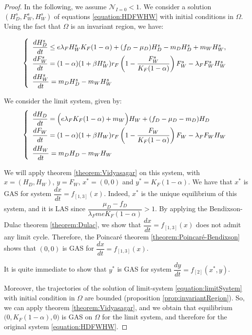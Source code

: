 \documentclass{article}
\newcommand{\lfw}{\lambda_{F}}
\newcommand{\lfw}{\lambda_{F}}
\begin{document}
\begin{proof}
In the following, we assume $ \mathcal{N}_{I =0} < 1$. We consider a solution $(H_D^s, F_W^s, H_W^s)$ of equations \eqref{equation:HDFWHW} with initial conditions in $\Omega$. Using the fact that $\Omega$ is an invariant region, we have:

\begin{equation}
\def\arraystretch{2}
\left\{ \begin{array}{l}
\dfrac{dH^s_D}{dt} \leq e\lfw H^s_W K_F(1-\alpha) + (f_D - \mu_D) H^s_D - m_D H^s_D + m_W H^s_W , \\
\dfrac{dF^s_W}{dt} = (1-\alpha)(1 + \beta H_W^s) r_F \left(1 - \dfrac{F^s_W}{K_F(1-\alpha)} \right) F^s_W - \lfw F^s_W H^s_W \\
\dfrac{dH^s_W}{dt}= m_D H^s_D - m_W H^s_W 
\end{array} \right.
\end{equation}

We consider the limit system, given by:
\begin{equation}
\def\arraystretch{2}
\left\{ \begin{array}{l}
\dfrac{dH_D}{dt} = \Big(e\lfw K_F(1-\alpha) + m_W\Big)H_W + (f_D - \mu_D - m_D) H_D \\
\dfrac{dF_W}{dt} =(1-\alpha)(1 + \beta H_W) r_F \left(1 - \dfrac{F_W}{K_F(1-\alpha)} \right) F_W - \lfw F_W H_W \\
\dfrac{dH_W}{dt}= m_D H_D - m_W H_W 
\end{array} \right.
\label{equation:limitSystem}
\end{equation}

We will apply theorem \ref{theorem:Vidyasagar} on this system, with $x = (H_D, H_W)$, $y = F_W$, $x^* = (0,0)$ and $y^* = K_F(1- \alpha)$.
We have that $x^*$ is GAS for system $\dfrac{dx}{dt} = f_{[1,3]}(x)$. Indeed, $x^*$ is the unique equilibrium of this system, and it is LAS since $\dfrac{\mu_D - f_D}{\lfw m e K_F(1-\alpha)} >1$. By applying the Bendixson-Dulac theorem \ref{theorem:Dulac}, we show that $\dfrac{dx}{dt} = f_{[1,3]}(x)$ does not admit any limit cycle. Therefore, the Poincaré theorem \ref{theorem:Poincaré-Bendixson} shows that $(0, 0)$ is GAS for $\dfrac{dx}{dt} = f_{[1,3]}(x)$.

It is quite immediate to show that $y^*$ is GAS for system $\dfrac{dy}{dt} = f_{[2]}(x^*, y)$. 

Moreover, the trajectories of the solution of limit-system \eqref{equation:limitSystem} with initial condition in $\Omega$ are bounded (proposition \ref{prop:invariantRegion}). So, we can apply theorem \ref{theorem:Vidyasagar}, and we obtain that equilibrium $\Big(0, K_F(1-\alpha), 0 \Big)$ is GAS on $\Omega$ for the limit system, and therefore for the original system \eqref{equation:HDFWHW}.
\end{proof}
\end{document}
